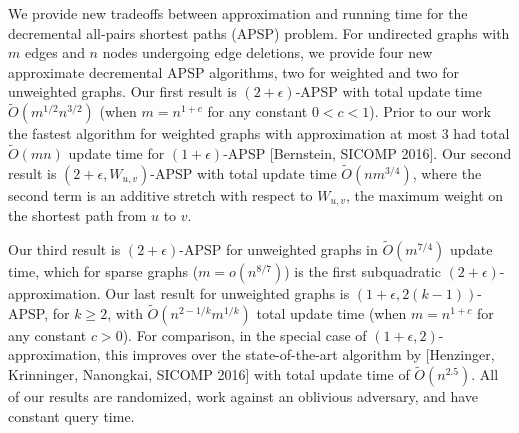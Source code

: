 We provide new tradeoffs between approximation and running time for the decremental all-pairs shortest paths (APSP) problem. For undirected graphs with $m$ edges and $n$ nodes undergoing edge deletions, we provide four new approximate decremental APSP algorithms, two for weighted and two for unweighted graphs. 
Our first result is $(2+ \epsilon)$-APSP with total update time $\tilde{O}(m^{1/2}n^{3/2})$ (when $m= n^{1+c}$ for any constant $0<c<1$).
Prior to our work the fastest algorithm for weighted graphs with approximation at most $3$ had total $\tilde O(mn)$ update time for $(1+\epsilon)$-APSP [Bernstein, SICOMP 2016]. 
Our second result is  $(2+\epsilon, W_{u,v})$-APSP with total update time $\tilde{O}(nm^{3/4})$, where the second term is an additive stretch with respect to $W_{u,v}$, the maximum weight on the shortest path from $u$ to $v$.  

Our third result is $(2+ \epsilon)$-APSP for unweighted graphs in $\tilde O(m^{7/4})$ update time, which for sparse graphs ($m=o(n^{8/7})$) is the first subquadratic $(2+\epsilon)$-approximation.
Our last result for unweighted graphs is $(1+\epsilon, 2(k-1))$-APSP, for $k \geq 2 $, with $\tilde{O}(n^{2-1/k}m^{1/k})$ total update time (when $m=n^{1+c}$ for any constant $c >0$). 
For comparison, in the special case of $(1+\epsilon, 2)$-approximation, this improves over the state-of-the-art algorithm by [Henzinger, Krinninger, Nanongkai, SICOMP 2016] with total update time of $\tilde{O}(n^{2.5})$.
All of our results are randomized, work against an oblivious adversary, and have constant query time. 

